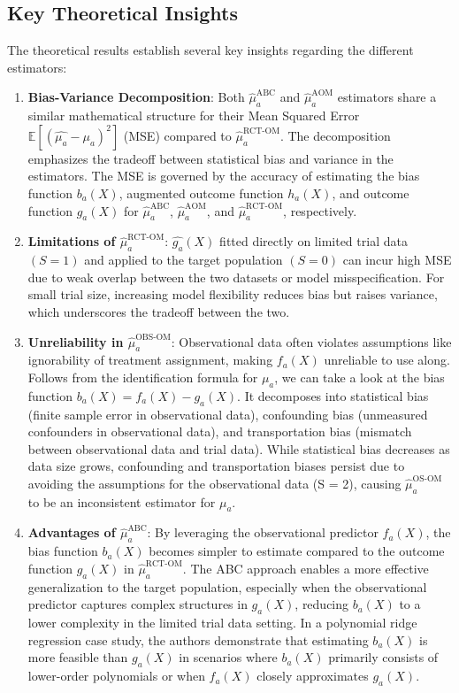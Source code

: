 \documentclass[12pt, oneside]{amsart}
\theoremstyle{definition}
\theoremstyle{remark}
\numberwithin{equation}{section}
\begin{document}
\subsection{Key Theoretical Insights}
The theoretical results establish several key insights regarding the different estimators:
\begin{enumerate}
    \item \textbf{Bias-Variance Decomposition}: Both $\hat{\mu}_a^{\text{ABC}}$ and $\hat{\mu}_a^{\text{AOM}}$ estimators share a similar mathematical structure for their Mean Squared Error $\mathbb{E}[(\hat{\mu_a} - \mu_a)^2 ]$ (MSE) compared to $\hat{\mu}_a^{\text{RCT-OM}}$. The decomposition emphasizes the tradeoff between statistical bias and variance in the estimators. The MSE is governed by the accuracy of estimating the bias function $b_a(X)$, augmented outcome function $h_a(X)$, and outcome function $g_a(X)$ for $\hat{\mu}_a^{\text{ABC}}$, $\hat{\mu}_a^{\text{AOM}}$, and $\hat{\mu}_a^{\text{RCT-OM}}$, respectively.

    \item \textbf{Limitations of $\hat{\mu}_a^{\text{RCT-OM}}$}: $\hat{g_a}(X)$ fitted directly on limited trial data $(S=1)$ and applied to the target population $(S=0)$ can incur high MSE due to weak overlap between the two datasets or model misspecification. For small trial size, increasing model flexibility reduces bias but raises variance, which underscores the tradeoff between the two. 

    \item \textbf{Unreliability in $\hat{\mu}_a^{\text{OBS-OM}}$}: Observational data often violates assumptions like ignorability of treatment assignment, making $f_a(X)$ unreliable to use along. Follows from the identification formula for $\mu_a$, we can take a look at the bias function $b_a(X) = f_a(X) - g_a(X)$. It decomposes into statistical bias (finite sample error in observational data), confounding bias (unmeasured confounders in observational data), and transportation bias (mismatch between observational data and trial data). While statistical bias decreases as data size grows, confounding and transportation biases persist due to avoiding the assumptions for the observational data (S = 2), causing $\hat{\mu}_a^{\text{OS-OM}}$ to be an inconsistent estimator for $\mu_a$. 

    \item \textbf{Advantages of $\hat{\mu}_a^{\text{ABC}}$}: By leveraging the observational predictor $f_a(X)$, the bias function $b_a(X)$ becomes simpler to estimate compared to the outcome function $g_a(X)$ in $\hat{\mu}_a^{\text{RCT-OM}}$. The ABC approach enables a more effective generalization to the target population, especially when the observational predictor captures complex structures in $g_a(X)$, reducing $b_a(X)$ to a lower complexity in the limited trial data setting. In a polynomial ridge regression case study, the authors demonstrate that estimating $b_a(X)$ is more feasible than $g_a(X)$ in scenarios where $b_a(X)$ primarily consists of lower-order polynomials or when $f_a(X)$ closely approximates $g_a(X)$. 


\end{enumerate}
\end{document}
